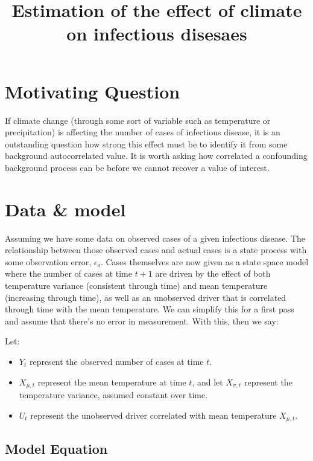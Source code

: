 \documentclass[
  letterpaper,
  DIV=11,
  numbers=noendperiod]{scrartcl}
\title{Estimation of the effect of climate on infectious disesaes}
\author{}
\date{}
\providecommand{\tightlist}{%
  \setlength{\itemsep}{0pt}\setlength{\parskip}{0pt}}\usepackage{longtable,booktabs,array}
\renewcommand*\contentsname{Table of contents}
\newcommand\contentsname{Table of contents}
\begin{document}
\maketitle

\renewcommand*\contentsname{Table of contents}
{
\hypersetup{linkcolor=}
\setcounter{tocdepth}{3}
\tableofcontents
}
\section{Motivating Question}\label{motivating-question}

If climate change (through some sort of variable such as temperature or
precipitation) is affecting the number of cases of infectious disease,
it is an outstanding question how strong this effect must be to identify
it from some background autocorrelated value. It is worth asking how
correlated a confounding background process can be before we cannot
recover a value of interest.

\section{Data \& model}\label{data-model}

Assuming we have some data on observed cases of a given infectious
disease. The relationship between those observed cases and actual cases
is a state process with some observation error, \(\epsilon_o\). Cases
themselves are now given as a state space model where the number of
cases at time \(t+1\) are driven by the effect of both temperature
variance (consistent through time) and mean temperature (increasing
through time), as well as an unobserved driver that is correlated
through time with the mean temperature. We can simplify this for a first
pass and assume that there's no error in measurement. With this, then we
say:

Let:

\begin{itemize}
\tightlist
\item
  \(Y_t\) represent the observed number of cases at time \(t\).
\item
  \(X_{\mu,t}\) represent the mean temperature at time \(t\), and let
  \(X_{\sigma,t}\) represent the temperature variance, assumed constant
  over time.
\item
  \(U_t\) represent the unobserved driver correlated with mean
  temperature \(X_{\mu,t}\).
\end{itemize}

\subsection{Model Equation}\label{model-equation}
\end{document}
